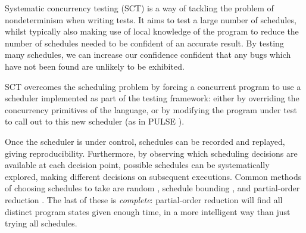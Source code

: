 Systematic concurrency testing (SCT) \citep{dpor, pbound, heisenbugs,
  empirical} is a way of tackling the problem of nondeterminism when
writing tests. It aims to test a large number of schedules, whilst
typically also making use of local knowledge of the program to reduce
the number of schedules needed to be confident of an accurate
result. By testing many schedules, we can increase our confidence
confident that any bugs which have not been found are unlikely to be
exhibited.

SCT overcomes the scheduling problem by forcing a concurrent program
to use a scheduler implemented as part of the testing framework:
either by overriding the concurrency primitives of the language, or by
modifying the program under test to call out to this new scheduler (as
in PULSE \citep{pulse}).

Once the scheduler is under control, schedules can be recorded and
replayed, giving reproducibility. Furthermore, by observing which
scheduling decisions are available at each decision point, possible
schedules can be systematically explored, making different decisions
on subsequent executions. Common methods of choosing schedules to take
are random \citep{empirical}, schedule bounding \citep{pbound}, and
partial-order reduction \citep{dpor}. The last of these is
\emph{complete}: partial-order reduction will find all distinct
program states given enough time, in a more intelligent way than just
trying all schedules.
